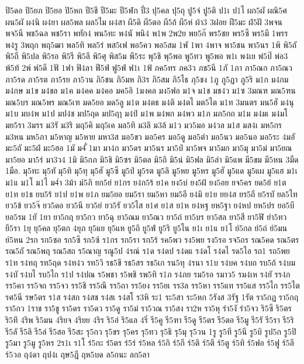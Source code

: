 {ปิ5ดอ
ปิ5ยภ
ปิ5ยอ
ปิ5หก
ปี5ชี
ปี5มะ
ปี5ฬก
ปี่3
ปุ5คล
ปุ5ถุ
ปู5จ๋
ปู5ติ
ป1เ
ป1ไ
ผก5ผั
ผณิ5ศ
ผน5ผั
ผ4นิ
ผ4ยา
ผล5พล
ผล5ไม
ผ4สา
ผี5ดิ
ผี5ตอ
ผี5ถ้
ผี5ห่
ผ้า3
3ฝอย
ฝี5มะ
ฝ่5ฝั
3พจน
พจ5นี
พช5ฉล
พช5รา
พทัก4
พน5ทะ
พ4นั
พนิ4
พ1พ
2พ2ย
พย5ก๊
พร5ชย
พร5ซี
พร5มี
1พรร
พ4รู
3พฤก
พฤ5ฒา
พล5ทิ
พล5ร่
พส5เฟ
พอ5คว
พอ5สม
1พั
1พา
4พาจ
พา5ชน
พา5นร
1พิ
พิ5ถั
พิ5ถี
พิ5ปล
พิ5รอ
พิ5รี
พิ5ลึ
พิ5ศุ
พิส5ม
พี5ระ
พุ5ชิ
พุ5พอ
พู5ทว
พู5พอ
พ1เ
พ4เย
พ่5ป๊
พ่อ3
พ้5ท้
2พ์
พ์5ดี
1ฟั
1ฟา
ฟิ4ลา
ฟี5ฟ่
ฟู5ฟ่
ฟ1เ
1ฟ้
ภค5ทร
ภค3ว
ภช5นี
1ภั
1ภา
ภา5ณก
ภา5ณว
ภา5รด
ภา5รต
ภา5รย
ภา5วน
ภิ5ชน
ภิ5มห
ภิ3ร
ภิ5สม
ภิ5ไธ
ภุ5ชง
1ภู
ภู5ฏา
ภู5ริ
ม1ก
ม4กม
ม4กษ
ม1ข
ม4ขล
ม1ค
ม4คค
ม4คอ
มค5อิ
1มงคล
มง5ฟอ
ม1จ
ม1ช
มช4ว
ม1ซ
3มณฑ
มณ5ฑน
มณ5บร
มณ5พร
มณ5เฑ
มด5ยอ
มด5ลู
ม1ต
ม4ตธ
ม4ติ
ม4ตไ
มต5ไต
ม1ท
3มนตร
มน5ฮั
ม4นุ
ม1บ
มบ4พ
ม1ป
มป4ช
มป5ฤด
มป5ฤๅ
ม4ป์
ม1พ
ม4พก
ม4พว
ม1ภ
มภ5กถ
ม1ม
ม4มเ
ม4มโ
มย5รา
3มรร
ม3รั
ม3ริ
มฤ5คิ
มฤ5เค
มล5ทิ
ม3ลิ
ม3ล้
ม1ว
มว5มอ
ม4วล
ม1ส
มส4เ
มห5กร
ม3หน
มห5ภา
ม5หาญ
ม5หาย
มหา3ส
มอ5ขว
มอ5คร
มอ5ดู
มอ5ตำ
มอ5นว
มอ5นอ
มอ5ระ
4มอั
มะ5ถั
มะ5ฝ่
มะ5ฮอ
1มั
ม4ั่
1มา
มา4ก
มา5ดร
มา5นร
มา5ป่
มา5พจ
มา5มก
มา5มุ
มา5ม่
มา5ยณ
มา5ยอ
มา5ร่
มา3ว4
1มิ
มิ5กภ
มิ5ชิ
มิ5ซร
มิ5ตล
มิ5ถิ
มิ5น่
มิ5ฟล
มิ5ลำ
มิ5แพ
มี5ขม
มี5หน
3มืด
1มือ.
มุ5ทะ
มุ5ทั
มุ5ทิ
มุ5ทุ
มุ5ฮั
มู5ซี
มู5ป่
มู5รต
มู5ลิ
มู5หย
มู5หร
มู5ฮั
มู5แด
มู5แผ
มู5แฮ
ม1เ
ม1แ
ม1โ
ม1ไ
ม4่า
3ม้า
ม์5ภิ
ยก5ย่
ย1กร
ย4ก5ร้
ย1ค
ยง5บ่
ยง5ฝ้
ยง5อย
ยจ5คร
ยด5ย้
ย1ต
ย1ท
ย1ธ
ยบ5ร้
ย1ป
ย1พ
ย1ภ
ยม5ยอ
ยม5รา
ยม5หา
ยม5อี
ย4มิ
ย1ย
ยย4ส
ยร5ถี
ย5รบั
ยล5ไท
ยว5ข้
ยว5จ๊
ยว5ดอ
ยว5นี
ยว5ย่
ยว5รั
ยว5ไส
ย1ศ
ย1ส
ย1ห
ย4หฐ
ยห5ฐา
ย4หป
ยห5ปร
ยอ5บี
ยอ5รม
1ยั
1ยา
ยา5กฤ
ยา5กว
ยา5ฉุ
ยา5ณม
ยา5ณว
ยา5ถ่
ยา5บร
ยา5สล
ยา5สี
ยา5ฬั
ยำ5ทว
ยี5รา
1ยุ
ยุ5คล
ยุ5ตก
4ยุภ
ยุ5แย
ยุ5แห
ยู5ถิ
ยู5ฟ่
ยู5ริ
ยู5ไน
ย1เ
ย1แ
ย1โ
ย์5กล
ย์5ถ่
ย์5มน
ย์5หน
2รก
รก5ซอ
รก5ซึ
รก5ซ้
ร1กร
รก5รา
รก5ร้
รค5พว
รง5พย
รง5รอ
รจ5ถร
รณ5คด
รณ5ตร
รณ5ถั
รณ5พฤ
รณ5สถ
ร5ณาญ
รณู5ป
4รณ์
ร1ด
ร4ดป
ร4ดแ
ร4ดโ
ร4ดไ
รด5ไอ
รถ1
รถ5พย
ร1ท
ร4ทฤ
รท5ฤด
ร4ท4ว
รท5วิ
รธ5ขึ
รธ5สร
รธ5เก
รน5ทุ
4รนา
ร1บ
ร4บค
ร4บถ
รบ5ถ้
ร4บม
ร4บั
ร4บไ
รบ5ไก
ร1ป
ร4ปณ
ร5พชา
ร5พชิ
รพ5ทิ
ร1ภ
ร4ภย
รม5รอ
รมาว5
รม4เห
ร4ยั
รร4ก
รร5คา
รร5จถ
รร5จว
รร5ชิ
รร5ณึ
รร5ถา
รร5ยง
รร5ยเ
รร3ล
รร5หา
รร5แท
รร5แส
รร5ไก
รร5ไต
รศ5นี
รษ5ตร
ร1ส
ร4สก
ร4สช
ร4สเ
ร4สโ
ร3หิ
ระ1
ระ5สา
ระ5หก
5รังส
3รัฐ
1รัต
รา5กฏ
รา5กฤ
รา5กว
1ราช
รา5ชู
รา5ดร
รา5ดว
รา5ดู
รา5ม่
รา5วณ
รา5สง
รา2ห
รา5หุ
รำ5งั
รำ5จว
ริ5ซึ
ริ5ตร
ริ5ทึ
4ริพ
ริ5มน
4ริยจ
4ริยย
4ริร
ริ5อ่
ริ5แล
4ริ่
รี5คู
รี5ฑา
รี5ดู
รี5ตร
รี5ตอ
รี5มู
รี5รั
รี5รา
รี5ริ
รี5ลั
รี5ลิ
รี5ล่
รี5สอ
รี5สะ
รุ5กว
รุ5ขร
รุ5คร
รุ5ทว
รุ5ธิ
รุ5มุ
รุ5วน
1รู
รู5ที
รู5นี
รู5บิ
รูป5ก
รู5ปิ
รู5มา
รู5มู
รู5หร
2ร1เ
ร1โ
ร่5กะ
ร่5ตร
ร่5ร่
ร่5หล
ร์5กิ
ร์5กี
ร์5ติ
ร์5ตี
ร์5ตู
ร์5ทิ
ร์5ฟอ
ร์5ฟู
ร์5ลี
ร์5วอ
ฤ4ดา
ฤป4เ
ฤษ5ฎี
ฤห5บด
ล5กนะ
ลก5ลา
}
